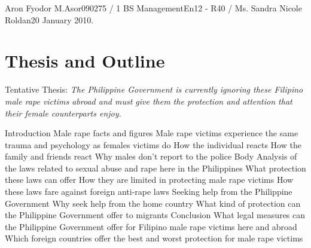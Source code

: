 \documentclass[letterpaper]{article}
\begin{document}
\begin{mla}{Aron Fyodor M.}{Asor}{090275 / 1 BS Management}{En12 - R40 / Ms. Sandra Nicole Roldan}{20 January 2010}{. }
\section{Thesis and Outline}
Tentative Thesis:\textit{ The Philippine Government is currently ignoring these Filipino male rape victims abroad and must give them the protection and attention that their female counterparts enjoy.}
\begin{outline}[enumerate]
	\1 Introduction
	\2 Male rape facts and figures
	\2 Male rape victims experience the same trauma and psychology as females victims do
	\3 How the individual reacts
	\3 How the family and friends react
	\3 Why males don't report to the police
	\1 Body
	\2 Analysis of the laws related to sexual abuse and rape here in the Philippines
	\3 What protection these laws can offer
	\3 How they are limited in protecting male rape victims
	\3 How these laws fare against foreign anti-rape laws
	\2 Seeking help from the Philippine Government
	\3 Why seek help from the home country
	\3 What kind of protection can the Philippine Government offer to migrants
	\1 Conclusion
	\2 What legal measures can the Philippine Government offer for Filipino male rape victims here and abroad
	\2 Which foreign countries offer the best and worst protection for male rape victims
\end{outline}

\newpage
\printbibliography

\end{mla}
\end{document}
